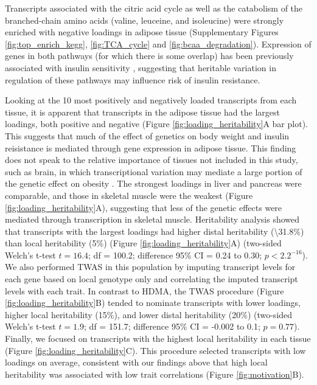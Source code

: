 \documentclass[
]{article}
\begin{document}
Transcripts associated with the citric acid cycle as well as the
catabolism of the branched-chain amino acids (valine, leuceine, and
isoleucine) were strongly enriched with negative loadings in adipose
tissue (Supplementary Figures \ref{fig:top_enrich_kegg},
\ref{fig:TCA_cycle} and \ref{fig:bcaa_degradation}). Expression of genes
in both pathways (for which there is some overlap) has been previously
associated with insulin sensitivity \cite{pmid29567659, 
pmid22560213, pmid19841271}, suggesting that heritable variation in
regulation of these pathways may influence risk of insulin resistance.

Looking at the 10 most positively and negatively loaded transcripts from
each tissue, it is apparent that transcripts in the adipose tissue had
the largest loadings, both positive and negative (Figure
\ref{fig:loading_heritability}A bar plot). This suggests that much of
the effect of genetics on body weight and insulin reisistance is
mediated through gene expression in adipose tissue. This finding does
not speak to the relative importance of tissues not included in this
study, such as brain, in which transcriptional variation may mediate a
large portion of the genetic effect on obesity \cite{pmid18721800}. The
strongest loadings in liver and pancreas were comparable, and those in
skeletal muscle were the weakest (Figure
\ref{fig:loading_heritability}A), suggesting that less of the genetic
effects were mediated through transcription in skeletal muscle.
Heritability analysis showed that transcripts with the largest loadings
had higher distal heritability (\textbackslash31.8\%) than local
heritability (5\%) (Figure \ref{fig:loading_heritability}A) (two-sided
Welch's t-test \(t = 16.4\); df = 100.2; difference 95\% CI = 0.24 to
0.30; \(p < 2.2^{-16}\)). We also performed TWAS in this population by
imputing transcript levels for each gene based on local genotype only
and correlating the imputed transcript levels with each trait. In
contrast to HDMA, the TWAS procedure (Figure
\ref{fig:loading_heritability}B) tended to nominate transcripts with
lower loadings, higher local heritability (15\%), and lower distal
heritability (20\%) (two-sided Welch's t-test \(t = 1.9\); df = 151.7;
difference 95\% CI = -0.002 to 0.1; \(p = 0.77\)). Finally, we focused
on transcripts with the highest local heritability in each tissue
(Figure \ref{fig:loading_heritability}C). This procedure selected
transcripts with low loadings on average, consistent with our findings
above that high local heritability was associated with low trait
correlations (Figure \ref{fig:motivation}B).
\end{document}
